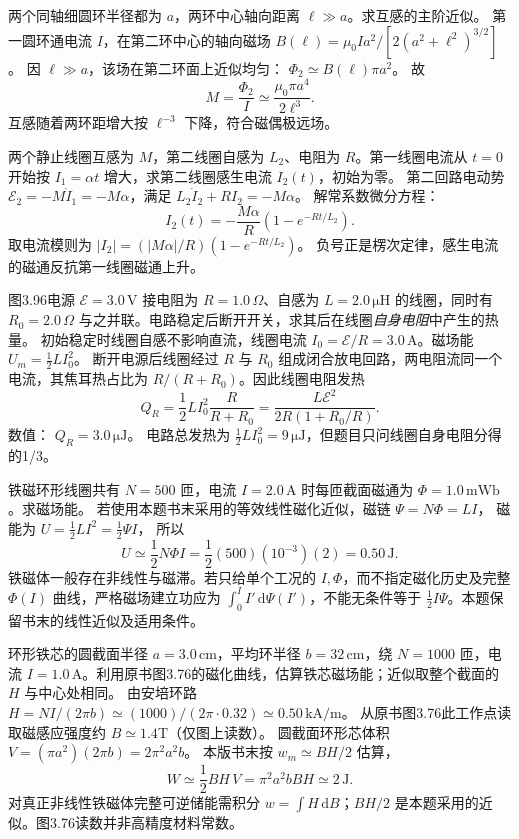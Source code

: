 两个同轴细圆环半径都为 $a$，两环中心轴向距离 $\ell\gg a$。求互感的主阶近似。
\exsolution
第一圆环通电流 $I$，在第二环中心的轴向磁场
$B(\ell)=\mu_0Ia^2/[2(a^2+\ell^2)^{3/2}]$。
因 $\ell\gg a$，该场在第二环面上近似均匀：
$\Phi_2\simeq B(\ell)\pi a^2$。
故
\[
\boxed{M=\frac{\Phi_2}I
\simeq\frac{\mu_0\pi a^4}{2\ell^3}}.
\]
\excheck 互感随着两环距增大按 $\ell^{-3}$ 下降，符合磁偶极远场。

两个静止线圈互感为 $M$，第二线圈自感为 $L_2$、电阻为 $R$。第一线圈电流从 $t=0$ 开始按 $I_1=\alpha t$ 增大，求第二线圈感生电流 $I_2(t)$，初始为零。
\exsolution
第二回路电动势
$\mathcal E_2=-M\dot I_1=-M\alpha$，满足
$L_2\dot I_2+RI_2=-M\alpha$。
解常系数微分方程：
\[
\boxed{I_2(t)=-\frac{M\alpha}{R}
\left(1-e^{-Rt/L_2}\right)}.
\]
取电流模则为
$|I_2|=(|M\alpha|/R)(1-e^{-Rt/L_2})$。
\excheck 负号正是楞次定律，感生电流的磁通反抗第一线圈磁通上升。

图3.96电源 $\mathcal E=3.0\,\mathrm V$ 接电阻为 $R=1.0\,\Omega$、自感为 $L=2.0\,\mathrm{\mu H}$ 的线圈，同时有 $R_0=2.0\,\Omega$ 与之并联。电路稳定后断开开关，求其后在线圈\emph{自身电阻}中产生的热量。
\exsolution
初始稳定时线圈自感不影响直流，线圈电流
$I_0=\mathcal E/R=3.0\,\mathrm A$。磁场能
$U_m=\frac12LI_0^2$。
断开电源后线圈经过 $R$ 与 $R_0$ 组成闭合放电回路，两电阻流同一个电流，其焦耳热占比为 $R/(R+R_0)$。因此线圈电阻发热
\[
Q_R=\frac12LI_0^2\frac{R}{R+R_0}
=\frac{L\mathcal E^2}{2R(1+R_0/R)}.
\]
数值：
$\boxed{Q_R=3.0\,\mathrm{\mu J}}$。
\excheck 电路总发热为 $\frac12LI_0^2=9\,\mathrm{\mu J}$，但题目只问线圈自身电阻分得的1/3。

铁磁环形线圈共有 $N=500$ 匝，电流 $I=2.0\,\mathrm A$ 时每匝截面磁通为 $\Phi=1.0\,\mathrm{mWb}$。求磁场能。
\exsolution
若使用本题书末采用的等效线性磁化近似，磁链 $\Psi=N\Phi=LI$，
磁能为 $U=\frac12 LI^2=\frac12\Psi I$，
所以
\[
\boxed{U\simeq\frac12N\Phi I
=\frac12(500)(10^{-3})(2)=0.50\,\mathrm J}.
\]
\excheck 铁磁体一般存在非线性与磁滞。若只给单个工况的 $I,\Phi$，而不指定磁化历史及完整 $\Phi(I)$ 曲线，严格磁场建立功应为 $\int_0^I I'\,\mathrm d\Psi(I')$，不能无条件等于 $\frac12I\Psi$。本题保留书末的线性近似及适用条件。

环形铁芯的圆截面半径 $a=3.0\,\mathrm{cm}$，平均环半径 $b=32\,\mathrm{cm}$，绕 $N=1000$ 匝，电流 $I=1.0\,\mathrm A$。利用原书图3.76的磁化曲线，估算铁芯磁场能；近似取整个截面的 $H$ 与中心处相同。
\exsolution
由安培环路
$H=NI/(2\pi b)\simeq(1000)/(2\pi\cdot0.32)
\simeq0.50\,\mathrm{kA/m}$。
从原书图3.76此工作点读取磁感应强度约 $B\simeq1.4$T（仅图上读数）。
圆截面环形芯体积
$V=(\pi a^2)(2\pi b)=2\pi^2a^2b$。
本版书末按 $w_m\simeq BH/2$ 估算，
\[
\boxed{W\simeq\frac12BH\,V
=\pi^2a^2bBH\simeq2\,\mathrm J}.
\]
\excheck 对真正非线性铁磁体完整可逆储能需积分 $w=\int H\,\mathrm dB$；$BH/2$ 是本题采用的近似。图3.76读数并非高精度材料常数。


